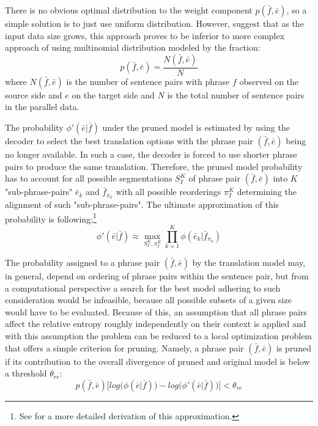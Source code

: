 There is no obvious optimal distribution to the weight component $p(\bar{f}, \bar{e})$,
so a simple solution is to just use uniform distribution.
However, \citet{ling:relentfilter} suggest that as the input data size grows, this
approach proves to be inferior to more complex approach of using multinomial distribution
modeled by the fraction:
\begin{equation}
  p(\bar{f}, \bar{e}) = \frac{N(\bar{f},\bar{e})}{N}
\end{equation}
where $N(\bar{f},\bar{e})$ is the number of sentence pairs with phrase $f$ observed on the
source side and $e$ on the target side and $N$ is the total number of sentence pairs
in the parallel data.

The probability $\phi'(\bar{e}|\bar{f})$ under the pruned model is estimated by using the
decoder to select the best translation options with the phrase pair $(\bar{f},\bar{e})$
being no longer available.
In such a case, the decoder is forced to use shorter phrase pairs to produce the same
translation.
Therefore, the pruned model probability has to account for all possible segmentations
$S_I^K$ of phrase pair $(\bar{f},\bar{e})$ into $K$ "sub-phrase-pairs"
$\bar{e}_k$ and $\bar{f}_{\pi_k}$ with all possible reorderings $\pi_I^K$ determining
the alignment of such "sub-phrase-pairs".
The ultimate approximation of this probability is following:\footnote{See
\citet{zens:systcomp} for a more detailed derivation of this approximation.}
\begin{equation}
  \phi'(\bar{e}|\bar{f}) \approx \max_{S_I^K,\pi_I^K}{\prod_{k=1}^{K} \phi(\bar{e}_k|\bar{f}_{\pi_k})}
\end{equation}

The probability assigned to a phrase pair $(\bar{f},\bar{e})$ by the translation model
may, in general, depend on ordering of phrase pairs within the sentence pair, but from
a computational perspective a search for the best model adhering to such consideration
would be infeasible, because all possible subsets of a given size would have to be evaluated.
Because of this, an assumption that all phrase pairs affect the relative entropy roughly
independently on their context is applied and with this assumption the problem can be
reduced to a local optimization problem that offers a simple criterion for pruning.
Namely, a phrase pair $(\bar{f},\bar{e})$ is pruned if its contribution to the overall
divergence of pruned and original model is below a threshold $\theta_{re}$:
\begin{equation}
  p(\bar{f},\bar{e}) \Big[log\big(\phi(\bar{e}|\bar{f})\big) - log\big(\phi'(\bar{e}|\bar{f})\big)\Big] < \theta_{re}
\end{equation}

